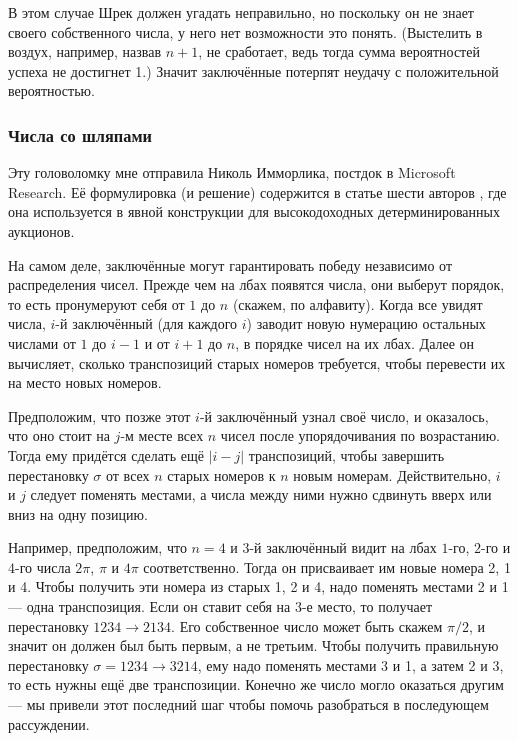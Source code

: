 В этом случае Шрек должен угадать неправильно, но поскольку он не знает своего собственного числа, у него нет возможности это понять.
(Выстелить в воздух, например, назвав $n + 1$, не сработает, ведь тогда сумма вероятностей успеха не достигнет 1.)
Значит заключённые потерпят неудачу с положительной вероятностью.

\subsubsection*{Числа со шляпами}

Эту головоломку мне отправила Николь Имморлика, постдок в Microsoft Research. Её формулировка (и решение) содержится в статье шести авторов \cite{1}, где она используется в явной конструкции для высокодоходных детерминированных аукционов.

На самом деле, заключённые могут гарантировать победу независимо от распределения чисел.
Прежде чем на лбах появятся числа, они выберут порядок, то есть пронумеруют себя от $1$ до $n$ (скажем, по алфавиту).
Когда все увидят числа, $i$-й заключённый (для каждого $i$) заводит новую нумерацию остальных числами от $1$ до $i - 1$ и от $i + 1$ до $n$, в порядке чисел на их лбах.
Далее он вычисляет, сколько транспозиций старых номеров требуется, чтобы перевести их на место новых номеров.

Предположим, что позже этот $i$-й заключённый узнал своё число, и оказалось, что оно стоит на $j$-м месте всех $n$ чисел после упорядочивания по возрастанию.
Тогда ему придётся сделать ещё $|i - j|$ транспозиций, чтобы завершить перестановку $\sigma$ от всех $n$ старых номеров к $n$ новым номерам.
Действительно, $i$ и $j$ следует поменять местами, а числа между ними нужно сдвинуть вверх или вниз на одну позицию.

Например, предположим, что $n = 4$ и $3$-й заключённый видит на лбах $1$-го, $2$-го и $4$-го числа $2\pi$, $\pi$ и $4\pi$ соответственно.
Тогда он присваивает им новые номера 2, 1 и 4.
Чтобы получить эти номера из старых 1, 2 и 4, надо поменять местами 2 и 1 --- одна транспозиция.
Если он ставит себя на 3-е место, то получает перестановку $1234 \to  2134$.
Его собственное число может быть скажем $\pi/2$, и значит он должен был быть первым, а не третьим.
Чтобы получить правильную перестановку  $\sigma  = 1234 \to  3214$, ему надо поменять местами 3 и 1, а затем 2 и 3, то есть нужны ещё две транспозиции.
Конечно же число могло оказаться другим --- мы привели этот последний шаг чтобы помочь разобраться в последующем  рассуждении.

